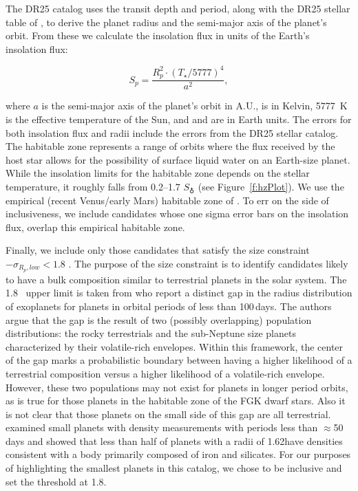 The DR25 catalog uses the transit depth and period, along with the DR25 stellar table of \citet{Mathur2017ApJS}, to derive the planet radius and the semi-major axis of the planet's orbit.  From these we calculate the insolation flux in units of the Earth's insolation flux:

\begin{equation}
S_{p} = \frac{R_{p}^{2} \cdot (T_{\star}/5777)^{4}}{a^{2}} ,
\end{equation}

\noindent where $a$ is the semi-major axis of the planet's orbit in A.U., \tstar{} is in Kelvin, 5777~K is the effective temperature of the Sun, and \sp{} and \rp{} are in Earth units. The errors for both insolation flux and radii include the errors from the DR25 stellar catalog. The habitable zone represents a range of orbits where the flux received by the host star allows for the possibility of surface liquid water on an Earth-size planet.  While the insolation limits for the habitable zone depends on the stellar temperature, it roughly falls from 0.2--1.7 $S_{\earth}$ (see Figure~\ref{f:hzPlot}). We use the empirical (recent Venus/early Mars) habitable zone of \citet{Kopparapu2013}.  To err on the side of inclusiveness, we include candidates whose one sigma error bars on the insolation flux, overlap this empirical habitable zone.  

Finally, we include only those candidates that satisfy the size constraint \rp $- \sigma_{{R_p},low} < 1.8$ \re.  The purpose of the size constraint is to identify candidates likely to have a bulk composition similar to terrestrial planets in the solar system.  The 1.8 \re\ upper limit is taken from \citet{Fulton2017} who report a distinct gap in the radius distribution of exoplanets for planets in orbital periods of less than 100\,days.  The authors argue that the gap is the result of two (possibly overlapping) population distributions: the rocky terrestrials and the sub-Neptune size planets characterized by their volatile-rich envelopes.  Within this framework, the center of the gap marks a probabilistic boundary between having a higher likelihood of a terrestrial composition versus a higher likelihood of a volatile-rich envelope.  
{\color{blue}  However, these two populations may not exist for planets in longer period orbits, as is true for those planets in the habitable zone of the FGK dwarf stars. Also it is not clear that those planets on the small side of this gap are all terrestrial. \citet{Rogers2015} examined small planets with density measurements with periods less than $\approx$50 days and showed that less than half of planets with a radii of 1.62\re have densities consistent with a body primarily composed of iron and silicates.  For our purposes of highlighting the smallest planets in this catalog, we chose to be inclusive and set the threshold at 1.8\re.
}

